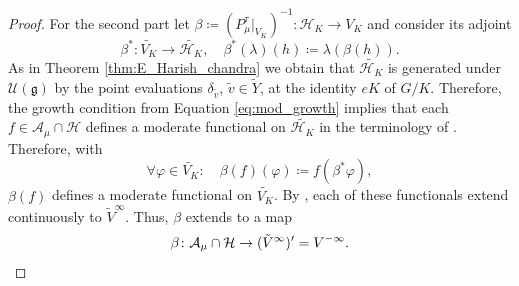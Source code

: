 \documentclass[JEP,XML,SOM,NoFloatCountersInSection,Unicode,published]{cedram}
\theoremstyle{definition}
\newcommand{\mc}[1]{\ensuremath{\mathcal{#1}}}
\newcommand{\mf}[1]{\ensuremath{\mathfrak{#1}}}
\begin{document}
\begin{proof}
For the second part let $\beta\coloneqq(P_\mu^\tau\vert_{V_K})^{-1}\colon\mc H_K\to V_K$ and consider its adjoint
\[
\beta^*\colon\widetilde{V_K}\to\widetilde{\mc H_K},\quad \beta^*(\lambda)(h)\coloneqq\lambda(\beta(h)).
\]
As in Theorem \ref{thm:E_Harish_chandra} we obtain that $\widetilde{\mc H_K}$ is generated under $\mc U(\mf g)$ by the point evaluations $\delta_{\tilde v}$, $\tilde v\in\tilde Y$, at the identity $eK$ of $G/K$. Therefore, the growth condition from Equation \eqref{eq:mod_growth} implies that each $f\in\mc A_\mu\cap\mc H$ defines a moderate functional on $\widetilde{\mc H_K}$ in the terminology of \cite[11.6]{W92}. Therefore, with
\[
\forall\varphi\in\widetilde{V_K}\colon\quad\beta(f)(\varphi)\coloneqq f(\beta^*\varphi),
\]
$\beta(f)$ defines a moderate functional on $\widetilde{V_K}$. By \cite[Prop.\,11.6.2]{W92}, each of these functionals extend continuously to $\tilde V^\infty$. Thus, $\beta$ extends to a map
\[
\beta\colon\mc A_\mu\cap\mc H\to(\tilde V^\infty)'=V^{-\infty}.\qedhere
\]
\end{proof}

\backmatter


\end{document}
